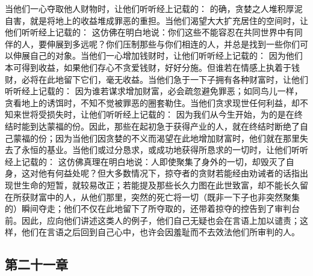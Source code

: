 当他们一心夺取他人财物时，让他们听听经上记载的： 的确，贪婪之人堆积厚泥自害，就是将地上的收益堆成罪恶的重担。当他们渴望大大扩充居住的空间时，让他们听听经上记载的： 这仿佛在明白地说：你们这些不能容忍在共同世界中有同伴的人，要伸展到多远呢？你们压制那些与你们相连的人，并总是找到一些你们可以伸展自己的对象。当他们一心增加钱财时，让他们听听经上记载的： 因为他们本可得到收益，如果他们存心不贪爱钱财，好好分施。但谁若在情感上执着于钱财，必将在此地留下它们，毫无收益。当他们急于一下子拥有各种财富时，让他们听听经上记载的： 因为谁若谋求增加财富，必会疏忽避免罪恶；如同鸟儿一样，贪看地上的诱饵时，不知不觉被罪恶的圈套勒住。当他们贪求现世任何利益，却不知来世将受损失时，让他们听听经上记载的： 因为我们从今生开始，为的是在终结时能到达蒙福的份。因此，那些在起初急于获得产业的人，就在终结时断绝了自己蒙福的份；因为当他们因贪婪的不义而渴望在此地增加财富时，他们就在那里失去了永恒的基业。当他们或过分恳求，或成功地获得所恳求的一切时，让他们听听经上记载的： 这仿佛真理在明白地说：人即使聚集了身外的一切，却毁灭了自身，这对他有何益处呢？但大多数情况下，掠夺者的贪财若能经由劝诫者的话指出现世生命的短暂，就较易改正；若能提及那些长久力图在此世致富，却不能长久留在所获财富中的人，从他们那里，突然的死亡将一切（既非一下子也非突然聚集的）瞬间夺走；他们不仅在此地留下了所夺取的，还带着掠夺的控告到了审判台前。因此，应向他们讲述这类人的例子，他们自己无疑也会在言语上加以谴责；这样，他们在言语之后回到自己心中，也许会因羞耻而不去效法他们所审判的人。\par


\subsection{第二十一章}

\par

